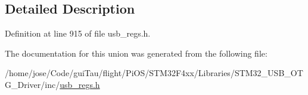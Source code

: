 \subsection{Detailed Description}


Definition at line 915 of file usb\-\_\-regs.\-h.



The documentation for this union was generated from the following file\-:\begin{DoxyCompactItemize}
\item 
/home/jose/\-Code/gui\-Tau/flight/\-Pi\-O\-S/\-S\-T\-M32\-F4xx/\-Libraries/\-S\-T\-M32\-\_\-\-U\-S\-B\-\_\-\-O\-T\-G\-\_\-\-Driver/inc/\hyperlink{_s_t_m32_f4xx_2_libraries_2_s_t_m32___u_s_b___o_t_g___driver_2inc_2usb__regs_8h}{usb\-\_\-regs.\-h}\end{DoxyCompactItemize}
